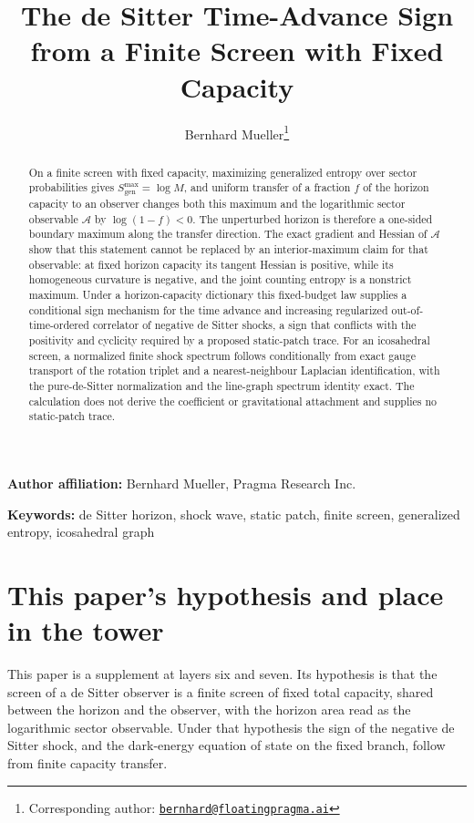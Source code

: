 \documentclass[11pt]{article}
\title{\textbf{The de Sitter Time-Advance Sign\\
from a Finite Screen with Fixed Capacity}}
\author{Bernhard Mueller\thanks{Corresponding author:
\href{mailto:bernhard@floatingpragma.ai}{\texttt{bernhard@floatingpragma.ai}}}}
\date{\OPHPaperReleaseDate}
\theoremstyle{remark}
\begin{document}
\maketitle
\OPHPaperReleaseBanner

\begin{center}
\small\textbf{Author affiliation:} Bernhard Mueller, Pragma Research Inc.
\end{center}

\begin{abstract}
On a finite screen with fixed capacity, maximizing generalized entropy over
sector probabilities gives \(S_{\mathrm{gen}}^{\max}=\log M\), and uniform
transfer of a fraction \(f\) of the horizon capacity to an observer changes
both this maximum and the logarithmic sector observable \(\mathcal A\) by
\(\log(1-f)<0\). The unperturbed horizon is therefore a one-sided boundary
maximum along the transfer direction. The exact gradient and Hessian of
\(\mathcal A\) show that this statement cannot be replaced by an
interior-maximum claim for that observable: at fixed horizon capacity its
tangent Hessian is positive, while its homogeneous curvature is negative,
and the joint counting entropy is a nonstrict maximum. Under a
horizon-capacity dictionary this fixed-budget law supplies a conditional sign
mechanism for the time advance and increasing regularized
out-of-time-ordered correlator of negative de Sitter shocks, a sign that
conflicts with the positivity and cyclicity required by a proposed
static-patch trace. For an icosahedral screen, a normalized finite shock
spectrum follows conditionally from exact gauge transport of the rotation
triplet and a nearest-neighbour Laplacian identification, with the
pure-de-Sitter normalization and the line-graph spectrum identity exact. The
calculation does not derive the coefficient or gravitational attachment and
supplies no static-patch trace.
\end{abstract}

\noindent\textbf{Keywords:} de Sitter horizon, shock wave, static patch,
finite screen, generalized entropy, icosahedral graph



\section*{This paper's hypothesis and place in the tower}

This paper is a supplement at layers six and seven. Its hypothesis is that
the screen of a de Sitter observer is a finite screen of fixed total
capacity, shared between the horizon and the observer, with the horizon
area read as the logarithmic sector observable. Under that hypothesis the
sign of the negative de Sitter shock, and the dark-energy equation of state
on the fixed branch, follow from finite capacity transfer.
\end{document}
